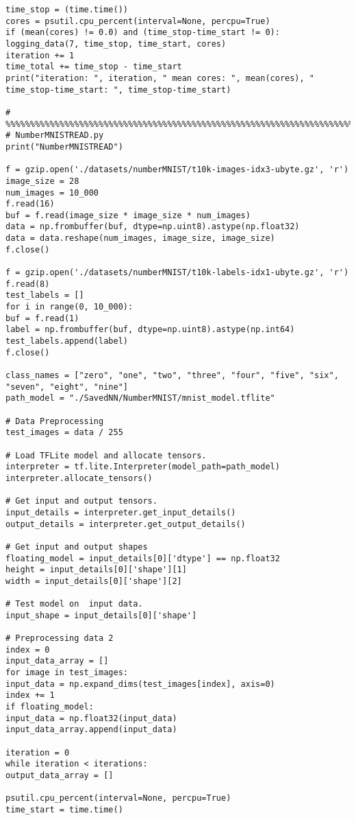 \begin{lstlisting}
time_stop = (time.time())
cores = psutil.cpu_percent(interval=None, percpu=True)
if (mean(cores) != 0.0) and (time_stop-time_start != 0):
logging_data(7, time_stop, time_start, cores)
iteration += 1
time_total += time_stop - time_start
print("iteration: ", iteration, " mean cores: ", mean(cores), " time_stop-time_start: ", time_stop-time_start)

# %%%%%%%%%%%%%%%%%%%%%%%%%%%%%%%%%%%%%%%%%%%%%%%%%%%%%%%%%%%%%%%%%%%%%%%%%%%%%%%%%%%%%%%
# NumberMNISTREAD.py
print("NumberMNISTREAD")

f = gzip.open('./datasets/numberMNIST/t10k-images-idx3-ubyte.gz', 'r')
image_size = 28
num_images = 10_000
f.read(16)
buf = f.read(image_size * image_size * num_images)
data = np.frombuffer(buf, dtype=np.uint8).astype(np.float32)
data = data.reshape(num_images, image_size, image_size)
f.close()

f = gzip.open('./datasets/numberMNIST/t10k-labels-idx1-ubyte.gz', 'r')
f.read(8)
test_labels = []
for i in range(0, 10_000):
buf = f.read(1)
label = np.frombuffer(buf, dtype=np.uint8).astype(np.int64)
test_labels.append(label)
f.close()

class_names = ["zero", "one", "two", "three", "four", "five", "six", "seven", "eight", "nine"]
path_model = "./SavedNN/NumberMNIST/mnist_model.tflite"

# Data Preprocessing
test_images = data / 255

# Load TFLite model and allocate tensors.
interpreter = tf.lite.Interpreter(model_path=path_model)
interpreter.allocate_tensors()

# Get input and output tensors.
input_details = interpreter.get_input_details()
output_details = interpreter.get_output_details()

# Get input and output shapes
floating_model = input_details[0]['dtype'] == np.float32
height = input_details[0]['shape'][1]
width = input_details[0]['shape'][2]

# Test model on  input data.
input_shape = input_details[0]['shape']

# Preprocessing data 2
index = 0
input_data_array = []
for image in test_images:
input_data = np.expand_dims(test_images[index], axis=0)
index += 1
if floating_model:
input_data = np.float32(input_data)
input_data_array.append(input_data)

iteration = 0
while iteration < iterations:
output_data_array = []

psutil.cpu_percent(interval=None, percpu=True)
time_start = time.time()


\end{lstlisting}
